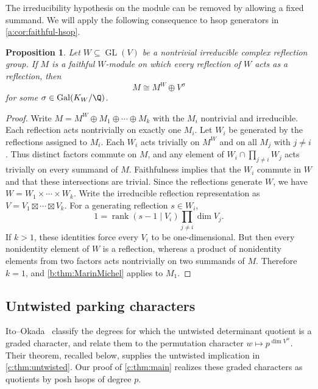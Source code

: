 \documentclass[10pt,a4paper]{amsart}
\newtheorem{proposition}[theorem]{Proposition}
\theoremstyle{definition}
\begin{document}
The irreducibility hypothesis on the module can be removed by allowing
a fixed summand. We will apply the following consequence to hsop
generators in \cref{a:cor:faithful-hsop}.

\begin{proposition}\label{a:prop:faithful-reflection-module}
Let $W\subseteq\operatorname{GL}(V)$ be a nontrivial irreducible complex
reflection group. If $M$ is a faithful $W$-module on which every
reflection of $W$ acts as a reflection, then
\[
 M\cong M^W\oplus V^\sigma
\]
for some $\sigma\in\operatorname{Gal}(K_W/\Q)$.
\end{proposition}
\begin{proof}
Write $M=M^W\oplus M_1\oplus\cdots\oplus M_k$ with the $M_i$
nontrivial and irreducible. Each reflection acts nontrivially on exactly
one $M_i$. Let $W_i$ be generated by the reflections assigned to $M_i$.
Each $W_i$ acts trivially on $M^W$ and on all $M_j$ with $j\ne i$.
Thus distinct factors commute on $M$, and any element of
$W_i\cap\prod_{j\ne i}W_j$ acts trivially on every summand of $M$.
Faithfulness implies that the $W_i$ commute in $W$ and that these
intersections are trivial. Since the reflections generate $W$, we have
$W=W_1\times\cdots\times W_k$.
Write the irreducible reflection representation as
$V=V_1\boxtimes\cdots\boxtimes V_k$. For a generating reflection
$s\in W_i$,
\[
 1=\operatorname{rank}(s-1\mid V_i)\prod_{j\ne i}\dim V_j.
\]
If $k>1$, these identities force every $V_i$ to be one-dimensional.
But then every nonidentity element of $W$ is a reflection, whereas a
product of nonidentity elements from two factors acts nontrivially on
two summands of $M$. Therefore $k=1$, and \cref{b:thm:MarinMichel}
applies to $M_1$.
\end{proof}

\subsection{Untwisted parking characters}\label{b:sec:ito-okada}

Ito--Okada~\cite[Theorem~1.4]{IO} classify the degrees for which the
untwisted determinant quotient is a graded character, and relate them
to the permutation character $w\mapsto p^{\dim V^w}$.
Their theorem, recalled below, supplies the untwisted implication in
\cref{c:thm:untwisted}. Our proof of \cref{c:thm:main} realizes these
graded characters as quotients by posh hsops of degree $p$.
\end{document}
